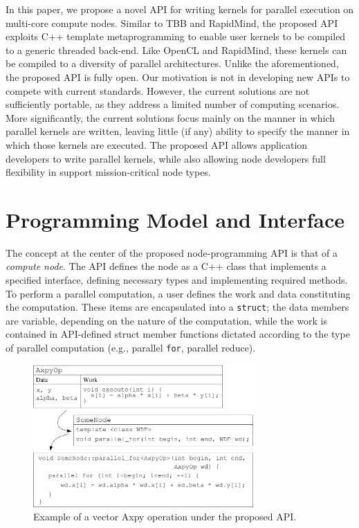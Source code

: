 \documentclass[10pt,conference,letterpaper]{IEEEtran}
\begin{document}
In this paper, we propose a novel API for writing kernels for parallel execution on multi-core compute nodes. Similar to TBB and RapidMind, the proposed API exploits C++ template metaprogramming to enable user kernels to be compiled to a generic threaded back-end. Like OpenCL and RapidMind, these kernels can be compiled to a diversity of parallel architectures. Unlike the aforementioned, the proposed API is fully open. Our motivation is not in developing new APIs to compete with current standards. However, the current solutions are not sufficiently portable, as they address a limited number of computing scenarios. More significantly, the current solutions focus mainly on the manner in which parallel kernels are written, leaving little (if any) ability to specify the manner in which those kernels are executed. The proposed API allows application developers to write parallel kernels, while also allowing node developers full flexibility in support mission-critical node types.

\section{Programming Model and Interface}


The concept at the center of the proposed node-programming API is that of a \emph{compute node}. The API defines the node as a C++ class that implements a specified interface, defining necessary types and implementing required methods. To perform a parallel computation, a user defines the work and data constituting the computation. These items are encapsulated into a \verb!struct!; the data members are variable, depending on the nature of the computation, while the work is contained in API-defined struct member functions dictated according to the type of parallel computation (e.g., parallel \verb!for!, parallel reduce). 

\begin{figure}[h]
	\centerline{\includegraphics[width=8.5cm]{AxpyExample.pdf} }
	\caption{Example of a vector Axpy operation under the proposed API.}
	\label{fig:axpy}
\end{figure}
\end{document}
